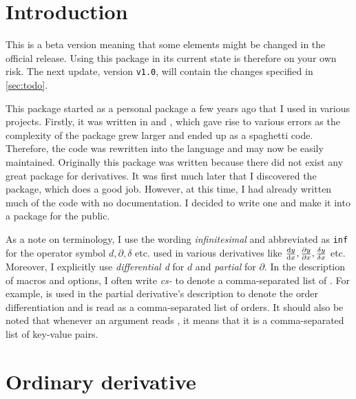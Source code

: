 \documentclass[final,british,10pt]{scrartcl}
\theoremstyle{remark}
\begin{document}
	
	\forside
	
	\clearpage
	\tableofcontents
	
	\clearpage
	\section{Introduction}
	This is a beta version meaning that some elements might be changed in the official release. Using this package in its current state is therefore on your own risk. The next update, version \texttt{v1.0}, will contain the changes specified in \cref{sec:todo}.
	
	This package started as a personal package a few years ago that I used in various projects. Firstly, it was written in \tex{} and \latex, which gave rise to various errors as the complexity of the package grew larger and ended up as a spaghetti code. Therefore, the code was rewritten into the  language and may now be easily maintained. Originally this package was written because there did not exist any great package for derivatives. It was first much later that I discovered the  package, which does a good job. However, at this time, I had already written much of the code with no documentation. I decided to write one and make it into a package for the public.
	
	As a note on terminology, I use the wording \emph{infinitesimal} and abbreviated as \texttt{inf} for the operator symbol $d, \partial, \delta$ etc. used in various derivatives like $\odv{y}{x}, \pdv{y}{x}, \fdv{y}{x}$ etc. Moreover, I explicitly use \emph{differential d} for $d$ and \emph{partial} for $\partial$. In the description of macros and options, I often write \emph{cs-} to denote a comma-separated list of . For example,  is used in the partial derivative's description to denote the order differentiation and is read as a comma-separated list of orders. It should also be noted that whenever an argument reads , it means that it is a comma-separated list of key-value pairs.
	
	
	
	
	
	
	\clearpage
	\section{Ordinary derivative}
	
\end{document}
